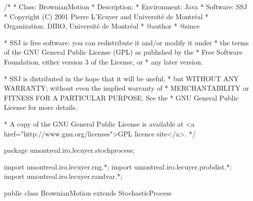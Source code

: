 \begin{code}
\begin{hide}
/*
 * Class:        BrownianMotion
 * Description:  
 * Environment:  Java
 * Software:     SSJ 
 * Copyright (C) 2001  Pierre L'Ecuyer and Université de Montréal
 * Organization: DIRO, Université de Montréal
 * @author       
 * @since

 * SSJ is free software: you can redistribute it and/or modify it under
 * the terms of the GNU General Public License (GPL) as published by the
 * Free Software Foundation, either version 3 of the License, or
 * any later version.

 * SSJ is distributed in the hope that it will be useful,
 * but WITHOUT ANY WARRANTY; without even the implied warranty of
 * MERCHANTABILITY or FITNESS FOR A PARTICULAR PURPOSE.  See the
 * GNU General Public License for more details.

 * A copy of the GNU General Public License is available at
   <a href="http://www.gnu.org/licenses">GPL licence site</a>.
 */
\end{hide}
package umontreal.iro.lecuyer.stochprocess;\begin{hide}
import umontreal.iro.lecuyer.rng.*;
import umontreal.iro.lecuyer.probdist.*;
import umontreal.iro.lecuyer.randvar.*;

\end{hide}

public class BrownianMotion extends StochasticProcess \begin{hide} {
    protected NormalGen    gen;
    protected double       mu,
                           sigma;
    // Precomputed values for standard BM
    protected double[]     mudt,
                           sigmasqrdt;
\end{hide}
\end{code}
